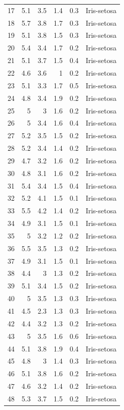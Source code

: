 \documentclass [oneside,10pt,a4paper,ngerman,BCOR10mm,headsepline,parindent,final]{scrartcl}
\begin{document}
\begin{longtable}[]{@{}rrrrrl@{}}
17 & 5.1 & 3.5 & 1.4 & 0.3 & Iris-setosa \\
18 & 5.7 & 3.8 & 1.7 & 0.3 & Iris-setosa \\
19 & 5.1 & 3.8 & 1.5 & 0.3 & Iris-setosa \\
20 & 5.4 & 3.4 & 1.7 & 0.2 & Iris-setosa \\
21 & 5.1 & 3.7 & 1.5 & 0.4 & Iris-setosa \\
22 & 4.6 & 3.6 & 1 & 0.2 & Iris-setosa \\
23 & 5.1 & 3.3 & 1.7 & 0.5 & Iris-setosa \\
24 & 4.8 & 3.4 & 1.9 & 0.2 & Iris-setosa \\
25 & 5 & 3 & 1.6 & 0.2 & Iris-setosa \\
26 & 5 & 3.4 & 1.6 & 0.4 & Iris-setosa \\
27 & 5.2 & 3.5 & 1.5 & 0.2 & Iris-setosa \\
28 & 5.2 & 3.4 & 1.4 & 0.2 & Iris-setosa \\
29 & 4.7 & 3.2 & 1.6 & 0.2 & Iris-setosa \\
30 & 4.8 & 3.1 & 1.6 & 0.2 & Iris-setosa \\
31 & 5.4 & 3.4 & 1.5 & 0.4 & Iris-setosa \\
32 & 5.2 & 4.1 & 1.5 & 0.1 & Iris-setosa \\
33 & 5.5 & 4.2 & 1.4 & 0.2 & Iris-setosa \\
34 & 4.9 & 3.1 & 1.5 & 0.1 & Iris-setosa \\
35 & 5 & 3.2 & 1.2 & 0.2 & Iris-setosa \\
36 & 5.5 & 3.5 & 1.3 & 0.2 & Iris-setosa \\
37 & 4.9 & 3.1 & 1.5 & 0.1 & Iris-setosa \\
38 & 4.4 & 3 & 1.3 & 0.2 & Iris-setosa \\
39 & 5.1 & 3.4 & 1.5 & 0.2 & Iris-setosa \\
40 & 5 & 3.5 & 1.3 & 0.3 & Iris-setosa \\
41 & 4.5 & 2.3 & 1.3 & 0.3 & Iris-setosa \\
42 & 4.4 & 3.2 & 1.3 & 0.2 & Iris-setosa \\
43 & 5 & 3.5 & 1.6 & 0.6 & Iris-setosa \\
44 & 5.1 & 3.8 & 1.9 & 0.4 & Iris-setosa \\
45 & 4.8 & 3 & 1.4 & 0.3 & Iris-setosa \\
46 & 5.1 & 3.8 & 1.6 & 0.2 & Iris-setosa \\
47 & 4.6 & 3.2 & 1.4 & 0.2 & Iris-setosa \\
48 & 5.3 & 3.7 & 1.5 & 0.2 & Iris-setosa \\

\end{longtable}
\end{document}
